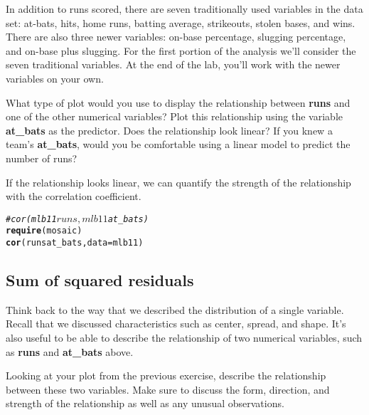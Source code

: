 \documentclass{article}\usepackage[]{graphicx}\usepackage[]{color}
\makeatletter
\newcommand{\hlcom}[1]{\textcolor[rgb]{0.678,0.584,0.686}{\textit{#1}}}%
\newcommand{\hlopt}[1]{\textcolor[rgb]{0,0,0}{#1}}%
\newcommand{\hlstd}[1]{\textcolor[rgb]{0.345,0.345,0.345}{#1}}%
\newcommand{\hlkwc}[1]{\textcolor[rgb]{0.333,0.667,0.333}{#1}}%
\newcommand{\hlkwd}[1]{\textcolor[rgb]{0.737,0.353,0.396}{\textbf{#1}}}%
\newenvironment{kframe}{%
 \def\at@end@of@kframe{}%
 \ifinner\ifhmode%
  \def\at@end@of@kframe{\end{minipage}}%
  \begin{minipage}{\columnwidth}%
 \fi\fi%
 \def\FrameCommand##1{\hskip\@totalleftmargin \hskip-\fboxsep
 \colorbox{shadecolor}{##1}\hskip-\fboxsep
     \hskip-\linewidth \hskip-\@totalleftmargin \hskip\columnwidth}%
 \MakeFramed {\advance\hsize-\width
   \@totalleftmargin\z@ \linewidth\hsize
   \@setminipage}}%
 {\par\unskip\endMakeFramed%
 \at@end@of@kframe}
\newenvironment{knitrout}{}{} %
\makeatother
\begin{document}
In addition to runs scored, there are seven traditionally used variables in the data set: at-bats, hits, home runs, batting average, strikeouts, stolen bases, and wins. There are also three newer variables: on-base percentage, slugging percentage, and on-base plus slugging.  For the first portion of the analysis we'll consider the seven traditional variables. At the end of the lab, you'll work with the newer variables on your own.

\begin{exercise}
What type of plot would you use to display the relationship between \hlkwd{runs} and one of the other numerical variables?  Plot this relationship using the variable \hlkwd{at\_bats} as the predictor.  Does the relationship look linear?  If you knew a team's \hlkwd{at\_bats}, would you be comfortable using a linear model to predict the number of runs?
\end{exercise}

If the relationship looks linear, we can quantify the strength of the relationship with the correlation coefficient.

\begin{knitrout}
\color{fgcolor}\begin{kframe}
\begin{alltt}
\hlcom{# cor(mlb11$runs, mlb11$at_bats)}
\hlkwd{require}\hlstd{(mosaic)}
\hlkwd{cor}\hlstd{(runs} \hlopt{\mytilde} \hlstd{at_bats,} \hlkwc{data} \hlstd{= mlb11)}
\end{alltt}
\end{kframe}
\end{knitrout}


\subsection*{Sum of squared residuals}
Think back to the way that we described the distribution of a single variable. Recall that we discussed characteristics such as center, spread, and shape.  It's also useful to be able to describe the relationship of two numerical variables, such as \hlkwd{runs} and \hlkwd{at\_bats} above.

\begin{exercise}
Looking at your plot from the previous exercise, describe the relationship between these two variables. Make sure to discuss the form, direction, and strength of the relationship as well as any unusual observations.
\end{exercise}
\end{document}
